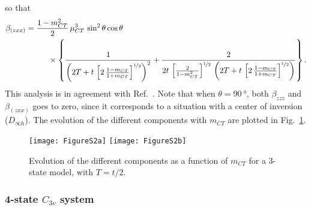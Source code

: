 \documentclass[journal=jpcafh]{achemso}
\begin{document}
so that\begin{align}
	\beta_{(zxx)} &= \frac{1-m_{CT}^2}{2}\,\mu_{CT}^3\,\sin^2\theta\cos\theta\nonumber\\
	&\hspace{1cm}\times\left\{\frac{1}{\left(2T + t\,\left[2\,\frac{1-m_{CT}}{1+m_{CT}}\right]^{\nicefrac{1}{2}}\right)^2} + \frac{2}{2t\,\left[\frac{2}{1-m_{CT}^2}\right]^{\nicefrac{1}{2}}\,\left(2T + t\,\left[2\,\frac{1-m_{CT}}{1+m_{CT}}\right]^{\nicefrac{1}{2}}\right)}\right\}.
\end{align}
This analysis is in agreement with Ref.~. Note that when $\theta=\SI{90}{°}$, both $\beta_{zzz}$ and $\beta_{(zxx)}$ goes to zero, since it corresponds to a situation with a center of inversion ($D_{\infty h}$). 
The evolution of the different components with $m_{CT}$ are plotted in Fig.~\ref{fig:3:cpt}.

\begin{figure}
	\texttt{[image: FigureS2a]}
	\texttt{[image: FigureS2b]}
	\caption{Evolution of the different components as a function of $m_{CT}$ for a  3-state model, with $T=t/2$.}
	\label{fig:3:cpt}
\end{figure}

\subsubsection{4-state $C_{3v}$ system}
\end{document}
